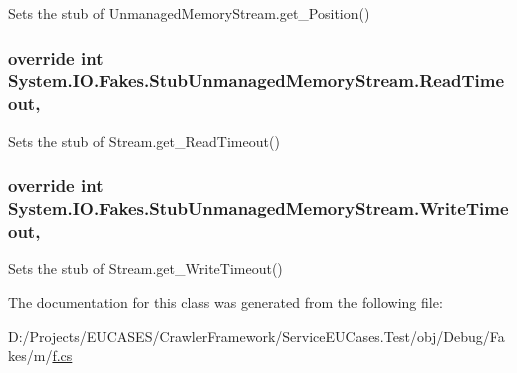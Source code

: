 Sets the stub of Unmanaged\-Memory\-Stream.\-get\-\_\-\-Position()

\hypertarget{class_system_1_1_i_o_1_1_fakes_1_1_stub_unmanaged_memory_stream_adea7e365f22e2357d86680344e49e649}{
\subsubsection[{Read\-Timeout}]{\setlength{\rightskip}{0pt plus 5cm}override int System.\-I\-O.\-Fakes.\-Stub\-Unmanaged\-Memory\-Stream.\-Read\-Timeout\hspace{0.3cm}{\ttfamily [get]}, {\ttfamily [set]}}}\label{class_system_1_1_i_o_1_1_fakes_1_1_stub_unmanaged_memory_stream_adea7e365f22e2357d86680344e49e649}


Sets the stub of Stream.\-get\-\_\-\-Read\-Timeout()

\hypertarget{class_system_1_1_i_o_1_1_fakes_1_1_stub_unmanaged_memory_stream_aa26b397c0e12263c9812f3dd9d9fa959}{
\subsubsection[{Write\-Timeout}]{\setlength{\rightskip}{0pt plus 5cm}override int System.\-I\-O.\-Fakes.\-Stub\-Unmanaged\-Memory\-Stream.\-Write\-Timeout\hspace{0.3cm}{\ttfamily [get]}, {\ttfamily [set]}}}\label{class_system_1_1_i_o_1_1_fakes_1_1_stub_unmanaged_memory_stream_aa26b397c0e12263c9812f3dd9d9fa959}


Sets the stub of Stream.\-get\-\_\-\-Write\-Timeout()



The documentation for this class was generated from the following file\-:\begin{DoxyCompactItemize}
\item 
D\-:/\-Projects/\-E\-U\-C\-A\-S\-E\-S/\-Crawler\-Framework/\-Service\-E\-U\-Cases.\-Test/obj/\-Debug/\-Fakes/m/\hyperlink{m_2f_8cs}{f.\-cs}\end{DoxyCompactItemize}
